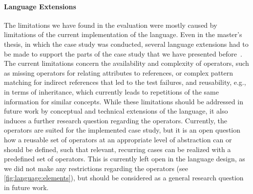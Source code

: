 \paragraph{Language Extensions}
The limitations we have found in the evaluation were mostly caused by limitations of the current implementation of the \commonalities language.
Even in the master's thesis, in which the case study was conducted, several language extensions had to be made to support the parts of the case study that we have presented before~.
The current limitations concern the availability and complexity of operators, such as missing operators for relating attributes to references, or complex pattern matching for indirect references that led to the test failures, and reusability, e.g., in terms of inheritance, which currently leads to repetitions of the same information for similar concepts.
While these limitations should be addressed in future work by conceptual and technical extensions of the \commonalities language, it also induces a further research question regarding the operators.
Currently, the operators are suited for the implemented case study, but it is an open question how a reusable set of operators at an appropriate level of abstraction can or should be defined, such that relevant, recurring cases can be realized with a predefined set of operators.
This is currently left open in the language design, as we did not make any restrictions regarding the operators (see \autoref{fig:language:elements}), but should be considered as a general research question in future work.



